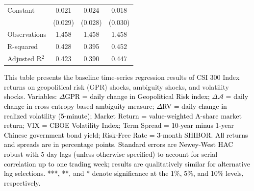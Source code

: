 \documentclass[preprint,12pt,authoryear]{elsarticle}
\begin{document}
\begin{table}[htbp]
\begin{threeparttable}
\begin{tabular*}{\textwidth}{@{\extracolsep{\fill}} lccc @{\extracolsep{\fill}}}
\midrule
Constant & 0.021 & 0.024 & 0.018 \\
& (0.029) & (0.028) & (0.030) \\
\midrule
Observations & 1,458 & 1,458 & 1,458 \\
R-squared & 0.428 & 0.395 & 0.452 \\
Adjusted R$^2$ & 0.423 & 0.390 & 0.447 \\
\bottomrule
\end{tabular*}
\begin{tablenotes}[flushleft]
\small
\item[] This table presents the baseline time-series regression results of CSI 300 Index returns on geopolitical risk (GPR) shocks, ambiguity shocks, and volatility shocks. \textcolor{black}{Variables: $\Delta$GPR = daily change in Geopolitical Risk index; $\Delta \mathcal{A}$ = daily change in cross-entropy-based ambiguity measure; $\Delta$RV = daily change in realized volatility (5-minute); Market Return = value-weighted A-share market return; VIX = CBOE Volatility Index; Term Spread = 10-year minus 1-year Chinese government bond yield; Risk-Free Rate = 3-month SHIBOR. All returns and spreads are in percentage points.} \textcolor{black}{Standard errors are Newey-West HAC robust with 5-day lags (unless otherwise specified) to account for serial correlation up to one trading week; results are qualitatively similar for alternative lag selections. ***, **, and * denote significance at the 1\%, 5\%, and 10\% levels, respectively.}
\end{tablenotes}
\end{threeparttable}
\end{table}
\end{document}
